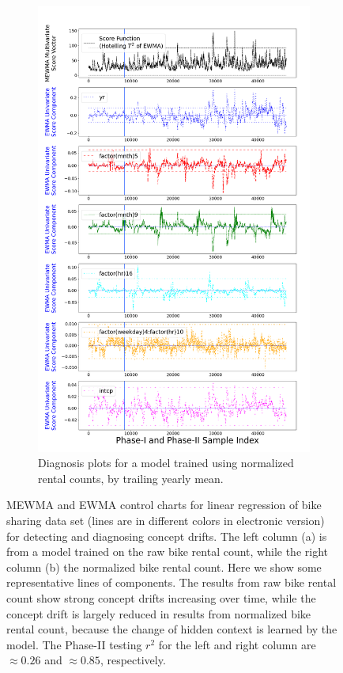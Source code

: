 \documentclass[twoside,11pt]{article}
\begin{document}
\begin{figure}[!htbp]
\begin{subfigure}[t]{0.49\linewidth}
        \includegraphics[width=1.0\textwidth, trim=.0in .0in .0in 1.2in, clip]{../figures/v14/bike_sharing/reg_lin_cat_norm_syr_10_pow_tr_3/neg_single_bike_fisher_mlines_with_regu_1e-08_0_0001_0_01_99_99.png}
     \captionsetup{width=.95\linewidth}
     \caption{Diagnosis plots for a model trained using normalized rental counts, by trailing yearly mean.}
     \label{fig:bs_norm_cnt}
\end{subfigure}
\caption{
MEWMA and EWMA control charts for linear regression of bike sharing data set (lines are in different colors in electronic version) for detecting and diagnosing concept drifts. The left column (a) is from a model trained on the raw bike rental count, while the right column (b) the normalized bike rental count. Here we show some representative lines of components. The results from raw bike rental count show strong concept drifts increasing over time, while the concept drift is largely reduced in results from normalized bike rental count, because the change of hidden context is learned by the model. The Phase-II testing $r^2$ for the left and right column are $\approx0.26$ and $\approx0.85$, respectively.
}
\label{fig:bike_sharing_diag}
\end{figure}
\end{document}
